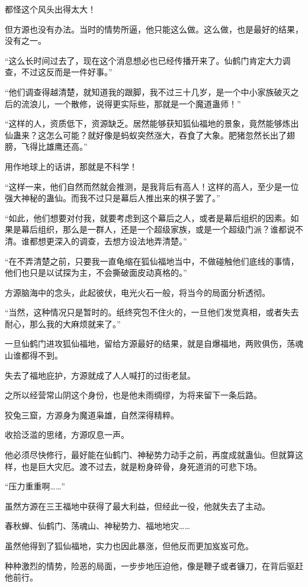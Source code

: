 \begin{this_body}
都怪这个风头出得太大！

但方源也没有办法。当时的情势所逼，他只能这么做。这么做，也是最好的结果，没有之一。

“这么长时间过去了，现在这个消息想必也已经传播开来了。仙鹤门肯定大力调查，不过这反而是一件好事。”

“他们调查得越清楚，就知道我的跟脚，我不过三十几岁，是一个中小家族破灭之后的流浪儿，一个散修，说得更实际些，那就是一个魔道蛊师！”

“这样的人，资质低下，资源缺乏。居然能够获知狐仙福地的景象，竟然能够炼出仙蛊来？这怎么可能？就好像是蚂蚁突然涨大，吞食了大象。肥猪忽然长出了翅膀，飞得比雄鹰还高。”

用作地球上的话讲，那就是不科学！

“这样一来，他们自然而然就会推测，是我背后有高人！这样的高人，至少是一位强大神秘的蛊仙。而我不过只是幕后人推出来的棋子罢了。”

“如此，他们想要对付我，就要考虑到这个幕后之人，或者是幕后组织的因素。如果是幕后组织，那么是一群人，还是一个超级家族，或是一个超级门派？谁都说不清。谁都想更深入的调查，去想方设法地弄清楚。”

“在不弄清楚之前，只要我一直龟缩在狐仙福地当中，不做碰触他们底线的事情，他们也只是以试探为主，不会撕破面皮动真格的。”

方源脑海中的念头，此起彼伏，电光火石一般，将当今的局面分析透彻。

“当然，这种情况只是暂时的。纸终究包不住火的，一旦他们发觉真相，或者失去耐心，那么我的大麻烦就来了。”

一旦仙鹤门进攻狐仙福地，留给方源最好的结果，就是自爆福地，两败俱伤，荡魂山谁都得不到。

失去了福地庇护，方源就成了人人喊打的过街老鼠。

之所以经营常山阴这个身份，也是他未雨绸缪，为将来留下一条后路。

狡兔三窟，方源身为魔道枭雄，自然深得精粹。

收拾泛滥的思绪，方源叹息一声。

他必须尽快修行，最好能在仙鹤门、神秘势力动手之前，再度成就蛊仙。但就算这样，也是巨大灾厄。渡不过去，就是粉身碎骨，身死道消的可悲下场。

“压力重重啊……”

虽然方源在三王福地中获得了最大利益，但经此一役，他就失去了主动。

春秋蝉、仙鹤门、荡魂山、神秘势力、福地地灾……

虽然他得到了狐仙福地，实力也因此暴涨，但他反而更加岌岌可危。

种种激烈的情势，险恶的局面，一步步地压迫他，像是鞭子或者镰刀，在背后驱赶他前行。


\end{this_body}

